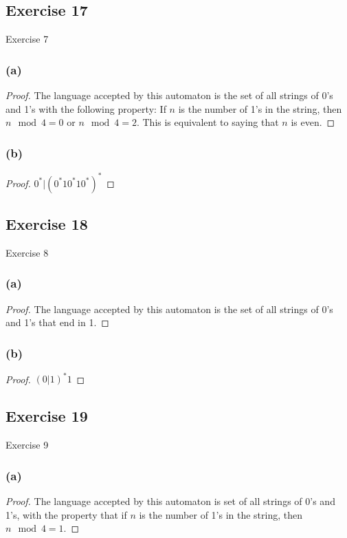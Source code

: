 \documentclass[14pt]{extarticle}
\begin{document}
\subsection{Exercise 17}
Exercise 7
\subsubsection{(a)}
\begin{proof}
The language accepted by this automaton is the set of all strings of 0’s and 1’s with the following property: If \(n\) 
is the number of 1’s in the string, then \(n \mod 4 = 0\) or \(n \mod 4 = 2\). 
This is equivalent to saying that \(n\) is even.
\end{proof}

\subsubsection{(b)}
\begin{proof}
\(0^* | (0^*10^*10^*)^*\)
\end{proof}

\subsection{Exercise 18}
Exercise 8
\subsubsection{(a)}

\begin{proof}
The language accepted by this automaton is the set of all strings of 0’s and 1’s that end in 1.
\end{proof}

\subsubsection{(b)}

\begin{proof}
\((0 | 1)^*1\)
\end{proof}

\subsection{Exercise 19}
Exercise 9
\subsubsection{(a)}

\begin{proof}
The language accepted by this automaton is set of all strings of 0’s and 1’s, with the property that if \(n\) is the number
of 1's in the string, then \(n \mod 4 = 1\).
\end{proof}
\end{document}
